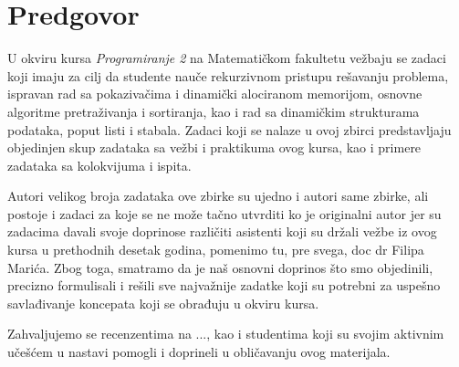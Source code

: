 
\chapter*{Predgovor}

U okviru kursa {\em Programiranje 2} na Matematičkom fakultetu vežbaju se zadaci koji imaju za cilj da studente nauče rekurzivnom pristupu rešavanju problema, ispravan rad sa pokazivačima i dinamički alociranom memorijom,  osnovne algoritme pretraživanja i sortiranja, kao i rad sa dinamičkim strukturama podataka, poput listi i stabala.  Zadaci koji se nalaze u ovoj zbirci predstavljaju objedinjen skup zadataka sa vežbi i praktikuma ovog kursa, kao i primere zadataka sa kolokvijuma i ispita. 

Autori velikog broja zadataka ove zbirke su ujedno i autori same zbirke, ali postoje i zadaci za koje se ne može tačno utvrditi ko je originalni autor jer su zadacima davali svoje doprinose različiti asistenti koji su držali vežbe iz ovog kursa u prethodnih desetak godina, pomenimo tu, pre svega, doc dr Filipa Marića. Zbog toga, smatramo da je naš osnovni doprinos što smo objedinili, precizno formulisali i rešili sve najvažnije zadatke koji su potrebni za uspešno savlađivanje koncepata koji se obrađuju u okviru kursa. 

Zahvaljujemo se recenzentima na ..., kao i studentima koji su svojim aktivnim učešćem u nastavi pomogli i doprineli u obličavanju ovog materijala. 




\bigskip
{}
